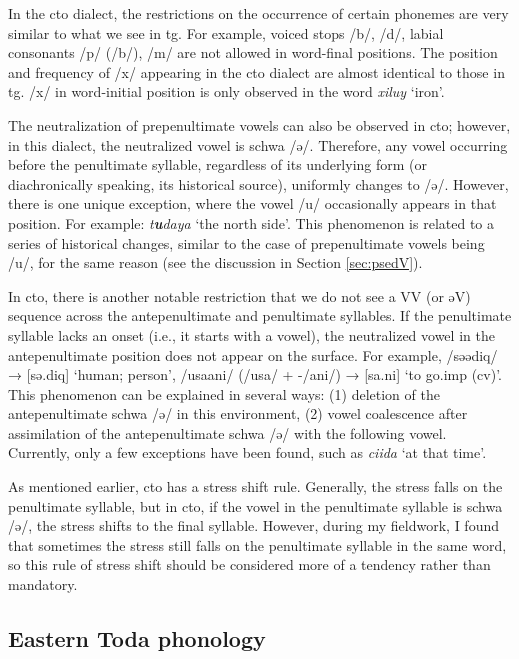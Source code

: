 In the \acl{cto} dialect, the restrictions on the occurrence of certain phonemes are very similar to what we see in \acl{tg}. For example, voiced stops /b/, /d/, labial consonants /p/ (/b/), /m/ are not allowed in word-final positions. The position and frequency of /x/ appearing in the \acl{cto} dialect are almost identical to those in \acl{tg}. /x/ in word-initial position is only observed in the word \textit{xiluy} `iron'.

The neutralization of prepenultimate vowels can also be observed in \acl{cto}; however, in this dialect, the neutralized vowel is schwa /ə/. Therefore, any vowel occurring before the penultimate syllable, regardless of its underlying form (or diachronically speaking, its historical source), uniformly changes to /ə/. However, there is one unique exception, where the vowel /u/ occasionally appears in that position. For example: \textit{t\textbf{u}daya} `the north side'. This phenomenon is related to a series of historical changes, similar to the case of prepenultimate vowels being /u/, for the same reason (see the discussion in Section \ref{sec:psedV}).

In \acl{cto}, there is another notable restriction that we do not see a VV (or əV) sequence across the antepenultimate and penultimate syllables. If the penultimate syllable lacks an onset (i.e., it starts with a vowel), the neutralized vowel in the antepenultimate position does not appear on the surface. For example, /səədiq/ → [sə.diq] `human; person', /usaani/ (/usa/ + -/ani/) → [sa.ni] `to go.\acs{imp} (\acs{cv})'. This phenomenon can be explained in several ways: (1) deletion of the antepenultimate schwa /ə/ in this environment, (2) vowel coalescence after assimilation of the antepenultimate schwa /ə/ with the following vowel. Currently, only a few exceptions have been found, such as \textit{ciida} `at that time'.

As mentioned earlier, \acl{cto} has a stress shift rule. Generally, the stress falls on the penultimate syllable, but in \acl{cto}, if the vowel in the penultimate syllable is schwa /ə/, the stress shifts to the final syllable. However, during my fieldwork, I found that sometimes the stress still falls on the penultimate syllable in the same word, so this rule of stress shift should be considered more of a tendency rather than mandatory.

\subsection{Eastern Toda phonology}

